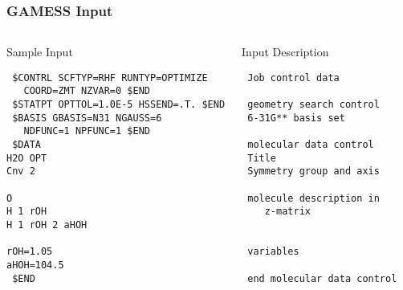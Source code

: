 \documentclass[slidestop,mathserif,compress,xcolor=svgnames]{beamer}
\begin{document}
\begin{frame}[fragile]
\frametitle{\small GAMESS Input}
\scriptsize{
\begin{columns}
\column{6.5cm}
\begin{block}{Sample Input}
\begin{verbatim}
 $CONTRL SCFTYP=RHF RUNTYP=OPTIMIZE 
   COORD=ZMT NZVAR=0 $END
 $STATPT OPTTOL=1.0E-5 HSSEND=.T. $END
 $BASIS GBASIS=N31 NGAUSS=6 
   NDFUNC=1 NPFUNC=1 $END
 $DATA
H2O OPT 
Cnv 2

O 
H 1 rOH 
H 1 rOH 2 aHOH

rOH=1.05
aHOH=104.5
 $END
\end{verbatim}
\end{block}
\column{5cm}
{\color{tigersblue}
\begin{alertblock}{Input Description}
\begin{verbatim}
 Job control data
   
 geometry search control
 6-31G** basis set  
   
 molecular data control
 Title
 Symmetry group and axis

 molecule description in 
    z-matrix


 variables

 end molecular data control
\end{verbatim}
\end{alertblock}
}
\end{columns}
}
\end{frame}
\end{document}
